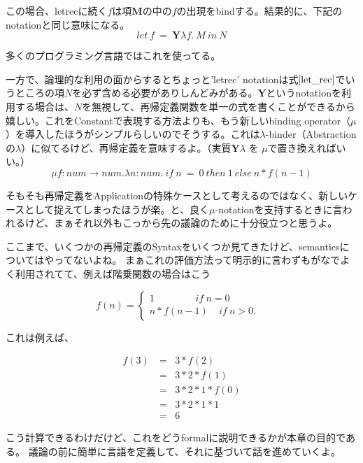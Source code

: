 \documentclass[9pt,fleqn]{jarticle}
\begin{document}
この場合、letrecに続く$f$は項$\bm{M}$の中の$f$の出現をbindする。結果的に、下記のnotationと同じ意味になる。
\begin{equation*}
	let\ f\ =\ \bm{Y}\lambda f.\ M\ in\ N
\end{equation*}

多くのプログラミング言語ではこれを使ってる。

\nl
一方で、論理的な利用の面からするとちょっと'letrec' notationは式$\ref{let_rec}$でいうところの項$N$を必ず含める必要がありしんどみがある。$\bm{Y}$というnotationを利用する場合は、$N$を無視して、再帰定義関数を単一の式を書くことができるから嬉しい。これをConstantで表現する方法よりも、もう新しいbinding operator（$\mu$）を導入したほうがシンプルらしいのでそうする。これは$\lambda$-binder（Abstractionの$\lambda$）に似てるけど、再帰定義を意味するよ。（実質$\bm{Y} \lambda$ を $\mu$で置き換えればいい。）
\begin{equation}
	\mu f: num \rightarrow num. \lambda n: num.\ if\ n\ =\ 0\ then\ 1\ else\ n*f(n-1)
\end{equation}

そもそも再帰定義をApplicationの特殊ケースとして考えるのではなく、新しいケースとして捉えてしまったほうが楽。と、良く$\mu$-notationを支持するときに言われるけど、まぁそれ以外もこっから先の議論のために十分役立つと思うよ。

\nl
ここまで、いくつかの再帰定義のSyntaxをいくつか見てきたけど、semanticsについてはやってないよね。
まぁこれの評価方法って明示的に言わずもがなでよく利用されてて、例えば階乗関数の場合はこう

\[
	f(n) = \begin{cases}
	1\ \ \ \ \ \ \ \ \ \ \ \ \ \ \ \ \ \ \ if\ n=0 & \\
	n * f(n-1)\ \ \ \ \ if\ n > 0. &
	\end{cases}
\]

これは例えば、

\begin{eqnarray*}
	f(3)\ &=& 3 * f(2) \nonumber \\
	&=& 3 * 2 * f(1) \nonumber \\
	&=& 3 * 2 * 1 * f(0) \nonumber \\
	&=& 3 * 2 * 1 * 1 \nonumber \\
	&=& 6
\end{eqnarray*}

こう計算できるわけだけど、これをどうformalに説明できるかが本章の目的である。
議論の前に簡単に言語を定義して、それに基づいて話を進めていくよ。

\newpage
\end{document}

